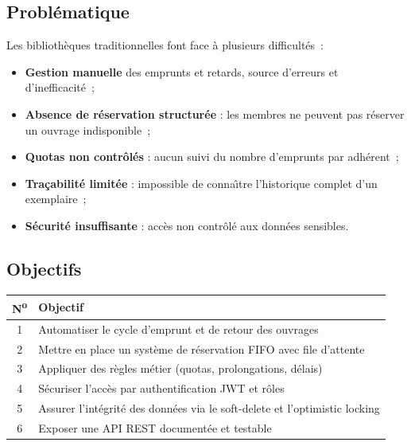 \documentclass[12pt,a4paper]{article}
\newcommand{\tableheader}[1]{%
  \cellcolor{navy}\color{white}\bfseries #1%
}
\begin{document}
\subsection{Probl\'ematique}
Les biblioth\`eques traditionnelles font face \`a plusieurs difficult\'es~:
\begin{itemize}[leftmargin=1.5em, label=\textcolor{navy}{$\bullet$}]
  \item \textbf{Gestion manuelle} des emprunts et retards, source d'erreurs et d'inefficacit\'e~;
  \item \textbf{Absence de r\'eservation structur\'ee} : les membres ne peuvent pas r\'eserver un ouvrage indisponible~;
  \item \textbf{Quotas non contr\^ol\'es} : aucun suivi du nombre d'emprunts par adh\'erent~;
  \item \textbf{Tra\c cabilit\'e limit\'ee} : impossible de conna\^{\i}tre l'historique complet d'un exemplaire~;
  \item \textbf{S\'ecurit\'e insuffisante} : acc\`es non contr\^ol\'e aux donn\'ees sensibles.
\end{itemize}

\subsection{Objectifs}
\begin{center}
\begin{tabularx}{\textwidth}{|c|X|}
\hline
\tableheader{N\textsuperscript{o}} & \tableheader{Objectif} \\
\hline
1 & Automatiser le cycle d'emprunt et de retour des ouvrages \\
\hline
2 & Mettre en place un syst\`eme de r\'eservation FIFO avec file d'attente \\
\hline
3 & Appliquer des r\`egles m\'etier (quotas, prolongations, d\'elais) \\
\hline
4 & S\'ecuriser l'acc\`es par authentification JWT et r\^oles \\
\hline
5 & Assurer l'int\'egrit\'e des donn\'ees via le soft-delete et l'optimistic locking \\
\hline
6 & Exposer une API REST document\'ee et testable \\
\hline
\end{tabularx}
\end{center}

\newpage
\end{document}
